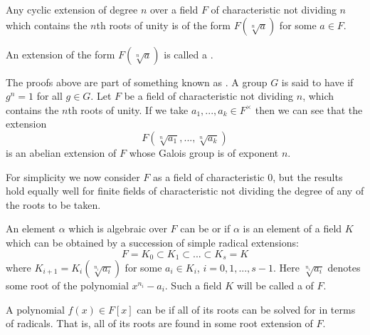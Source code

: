 \begin{prop}\label{prop:cyclicimpliesrad}
    Any cyclic extension of degree $n$ over a field $F$ of characteristic not dividing $n$ which contains the $n$th roots of unity is of the form $F(\sqrt[n]{a})$ for some $a \in F$.
\end{prop}

An extension of the form $F(\sqrt[n]{a})$ is called a . 

\begin{rmk}
    The proofs above are part of something known as . A group $G$ is said to have  if $g^n = 1$ for all $g \in G$. Let $F$ be a field of characteristic not dividing $n$, which contains the $n$th roots of unity. If we take $a_1,...,a_k \in F^{\times}$ then we can see that the extension \begin{equation*}
        F(\sqrt[n]{a_1},...,\sqrt[n]{a_k})
    \end{equation*}
    is an abelian extension of $F$ whose Galois group is of exponent $n$.
\end{rmk}


For simplicity we now consider $F$ as a field of characteristic $0$, but the results hold equally well for finite fields of characteristic not dividing the degree of any of the roots to be taken.

\begin{defn}
    An element $\alpha$ which is algebraic over $F$ can be  or  if $\alpha$ is an element of a field $K$ which can be obtained by a succession of simple radical extensions:\begin{equation*}
        F = K_0 \subset K_1 \subset ... \subset K_s = K
    \end{equation*}
    where $K_{i+1} = K_i(\sqrt[n_i]{a_i})$ for some $a_i \in K_i$, $i = 0,1,...,s-1$. Here $\sqrt[n_i]{a_i}$ denotes some root of the polynomial $x^{n_i}-a_i$. Such a field $K$ will be called a  of $F$.
\end{defn}

\begin{defn}
    A polynomial $f(x) \in F[x]$ can be  if all of its roots can be solved for in terms of radicals. That is, all of its roots are found in some root extension of $F$.
\end{defn}

